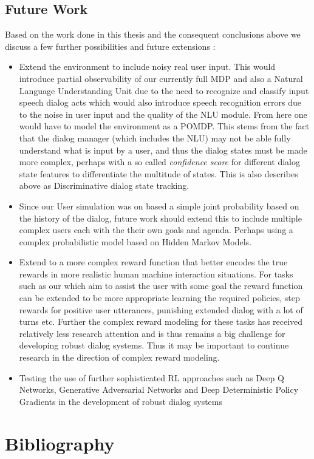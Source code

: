 \documentclass[14pt]{extarticle}
\numberwithin{equation}{section}
\begin{document}
	\subsection{Future Work}
	Based on the work done in this thesis and the consequent conclusions above we discuss a few further possibilities and future extensions :
	\begin{itemize}
		\item Extend the environment to include noisy real user input. This would introduce partial observability of our currently full MDP and also a Natural Language Understanding Unit due to the need to recognize and classify input speech dialog acts which would also introduce speech recognition errors due to the noise in user input and the quality of the NLU module. From here one would have to model the environment as a POMDP\cite{Sutton-introRL}. This stems from the fact that the dialog manager (which includes the NLU) may not be able fully understand what is input by a user, and thus the dialog states must be made more complex, perhaps with a so called \textit{confidence score} for different dialog state features to differentiate the multitude of states. This is also describes above as Discriminative dialog state tracking.
		\item Since our User simulation was on based a simple joint probability based on the history of the dialog, future work should extend this to include multiple complex users each with the their own goals and agenda. Perhaps using a complex probabilistic model based on Hidden Markov Models.
		\item Extend to a more complex reward function that better encodes the true rewards in more realistic human machine interaction situations. For tasks such as our which aim to assist the user with some goal the reward function can be extended to be more appropriate learning the required policies, step rewards for positive user utterances, punishing extended dialog with a lot of turns etc. Further the complex reward modeling for these tasks has received relatively less research attention and is thus remains a big challenge for developing robust dialog systems. Thus it may be important to continue research in the direction of complex reward modeling.
		\item Testing the use of further sophisticated RL approaches such as Deep Q Networks, Generative Adversarial Networks and Deep Deterministic Policy Gradients in the development of robust dialog systems
	\end{itemize}
	
	\clearpage
	\section[References]{Bibliography}
	
	
	
\end{document}
